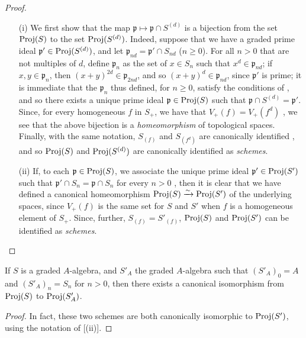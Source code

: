\begin{proof}
\medskip\noindent
\begin{enumerate}
  \item[{\rm(i)}] We first show that the map $\mathfrak{p}\mapsto\mathfrak{p}\cap S^{(d)}$ is a bijection from the set $\operatorname{Proj}(S)$ to the set $\operatorname{Proj}(S^{(d)})$.
    Indeed, suppose that we have a graded prime ideal $\mathfrak{p}'\in\operatorname{Proj}(S^{(d)})$, and let $\mathfrak{p}_{nd}=\mathfrak{p}'\cap S_{nd}$ ($n\geq0$).
    For all $n>0$ that are not multiples of $d$, define $\mathfrak{p}_n$ as the set of $x\in S_n$ such that $x^d\in\mathfrak{p}_{nd}$;
    if $x,y\in\mathfrak{p}_n$, then $(x+y)^{2d}\in\mathfrak{p}_{2nd}$, and so $(x+y)^d\in\mathfrak{p}_{nd}$, since $\mathfrak{p}'$ is prime;
    it is immediate that the $\mathfrak{p}_n$ thus defined, for $n\geq0$, satisfy the conditions of , and so there exists a unique prime ideal $\mathfrak{p}\in\operatorname{Proj}(S)$ such that $\mathfrak{p}\cap S^{(d)}=\mathfrak{p}'$.
    Since, for every homogeneous $f$ in $S_+$, we have that $V_+(f)=V_+(f^d)$ , we see that the above bijection is a \emph{homeomorphism} of topological spaces.
    Finally, with the same notation, $S_{(f)}$ and $S_{(f^d)}$ are canonically identified , and so $\operatorname{Proj}(S)$ and $\operatorname{Proj}(S^{(d)})$ are canonically identified as \emph{schemes}.
  \item[{\rm(ii)}] If, to each $\mathfrak{p}\in\operatorname{Proj}(S)$, we associate the unique prime ideal $\mathfrak{p}'\in\operatorname{Proj}(S')$ such that $\mathfrak{p}'\cap S_n=\mathfrak{p}\cap S_n$ for every $n>0$ , then it is clear that we have defined a canonical homeomorphism $\operatorname{Proj}(S)\xrightarrow{\sim}\operatorname{Proj}(S')$ of the underlying spaces, since $V_+(f)$ is the same set for $S$ and $S'$ when $f$ is a homogeneous element of $S_+$.
  Since, further, $S_{(f)}=S'_{(f)}$, $\operatorname{Proj}(S)$ and $\operatorname{Proj}(S')$ can be identified as \emph{schemes}.
\end{enumerate}
\end{proof}

\begin{corollary}[2.4.8]
\label{II.2.4.8}
If $S$ is a graded $A$-algebra, and $S'_A$ the graded $A$-algebra such that $(S'_A)_0=A$ and $(S'_A)_n=S_n$ for $n>0$, then there exists a canonical isomorphism from $\operatorname{Proj}(S)$ to $\operatorname{Proj}(S'_A)$.
\end{corollary}

\begin{proof}
In fact, these two schemes are both canonically isomorphic to $\operatorname{Proj}(S')$, using the notation of [(ii)].
\end{proof}


